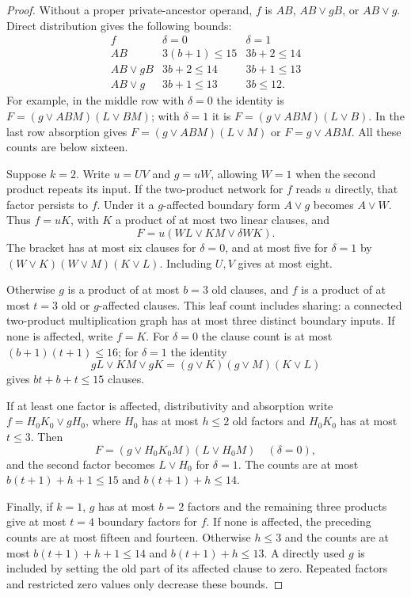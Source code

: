 \begin{proof}
Without a proper private-ancestor operand, $f$ is $AB$, $AB\vee gB$, or $AB\vee g$. Direct distribution gives the following bounds:
\[
\begin{array}{c|cc}
f&\delta=0&\delta=1\\\hline
AB&3(b+1)\le15&3b+2\le14\\
AB\vee gB&3b+2\le14&3b+1\le13\\
AB\vee g&3b+1\le13&3b\le12.
\end{array}
\]
For example, in the middle row with $\delta=0$ the identity is
$F=(g\vee ABM)(L\vee BM)$; with $\delta=1$ it is
$F=(g\vee ABM)(L\vee B)$. In the last row absorption gives
$F=(g\vee ABM)(L\vee M)$ or $F=g\vee ABM$.
All these counts are below sixteen.

Suppose $k=2$. Write $u=UV$ and $g=uW$, allowing $W=1$ when the second product repeats its input. If the two-product network for $f$ reads $u$ directly, that factor persists to $f$. Under it a $g$-affected boundary form $A\vee g$ becomes $A\vee W$. Thus $f=uK$, with $K$ a product of at most two linear clauses, and
\[
 F=u(WL\vee KM\vee\delta WK).
\]
The bracket has at most six clauses for $\delta=0$, and at most five for $\delta=1$ by
$(W\vee K)(W\vee M)(K\vee L)$. Including $U,V$ gives at most eight.

Otherwise $g$ is a product of at most $b=3$ old clauses, and $f$ is a product of at most $t=3$ old or $g$-affected clauses. This leaf count includes sharing: a connected two-product multiplication graph has at most three distinct boundary inputs. If none is affected, write $f=K$. For $\delta=0$ the clause count is at most $(b+1)(t+1)\le16$; for $\delta=1$ the identity
\[
 gL\vee KM\vee gK=(g\vee K)(g\vee M)(K\vee L)
\]
gives $bt+b+t\le15$ clauses.

If at least one factor is affected, distributivity and absorption write
$f=H_0K_0\vee gH_0$, where $H_0$ has at most $h\le2$ old factors and $H_0K_0$ has at most $t\le3$. Then
\[
 F=(g\vee H_0K_0M)(L\vee H_0M)\quad(\delta=0),
\]
and the second factor becomes $L\vee H_0$ for $\delta=1$. The counts are at most $b(t+1)+h+1\le15$ and $b(t+1)+h\le14$.

Finally, if $k=1$, $g$ has at most $b=2$ factors and the remaining three products give at most $t=4$ boundary factors for $f$. If none is affected, the preceding counts are at most fifteen and fourteen. Otherwise $h\le3$ and the counts are at most $b(t+1)+h+1\le14$ and $b(t+1)+h\le13$. A directly used $g$ is included by setting the old part of its affected clause to zero. Repeated factors and restricted zero values only decrease these bounds.


\end{proof}
